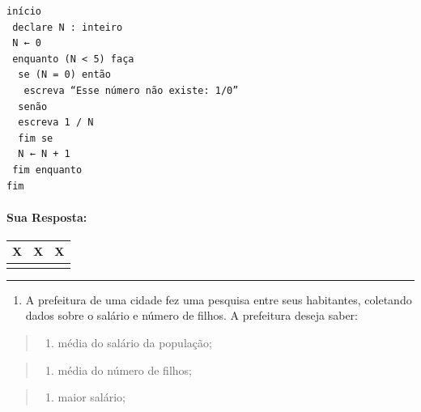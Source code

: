 \documentclass[12pt,a4paper]{article}
\providecommand{\tightlist}{%
      \setlength{\itemsep}{0pt}\setlength{\parskip}{0pt}}
\begin{document}
\begin{verbatim}
início
 declare N : inteiro
 N ← 0
 enquanto (N < 5) faça
  se (N = 0) então
   escreva “Esse número não existe: 1/0”
  senão
  escreva 1 / N
  fim se
  N ← N + 1
 fim enquanto
fim 
\end{verbatim}

    \hypertarget{sua-resposta}{%
\paragraph{Sua Resposta:}\label{sua-resposta}}

\begin{longtable}[]{@{}ccc@{}}
\toprule()
X & X & X \\
\midrule()
\endhead
& & \\
\bottomrule()
\end{longtable}

    \begin{center}\rule{0.5\linewidth}{0.5pt}\end{center}

\begin{enumerate}
\def\labelenumi{\arabic{enumi}.}
\setcounter{enumi}{4}
\tightlist
\item
  A prefeitura de uma cidade fez uma pesquisa entre seus habitantes,
  coletando dados sobre o salário e número de filhos. A prefeitura
  deseja saber:
\end{enumerate}

\begin{quote}
\begin{enumerate}
\def\labelenumi{\alph{enumi})}
\tightlist
\item
  média do salário da população;
\end{enumerate}
\end{quote}

\begin{quote}
\begin{enumerate}
\def\labelenumi{\alph{enumi})}
\setcounter{enumi}{1}
\tightlist
\item
  média do número de filhos;
\end{enumerate}
\end{quote}

\begin{quote}
\begin{enumerate}
\def\labelenumi{\alph{enumi})}
\setcounter{enumi}{2}
\tightlist
\item
  maior salário;
\end{enumerate}
\end{quote}
\end{document}
